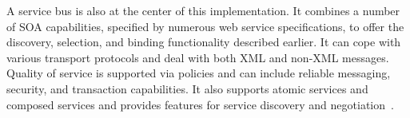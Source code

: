 A service bus is also at the center of this implementation.
It combines a number of SOA capabilities, specified by numerous web service specifications, to offer the discovery, selection, and binding functionality described earlier.
It can cope with various transport protocols and deal with both XML and non-XML messages.
Quality of service is supported via policies and can include reliable messaging, security, and transaction capabilities.
It also supports atomic services and composed services and provides features for service discovery and negotiation~\autocite{webservices}.
